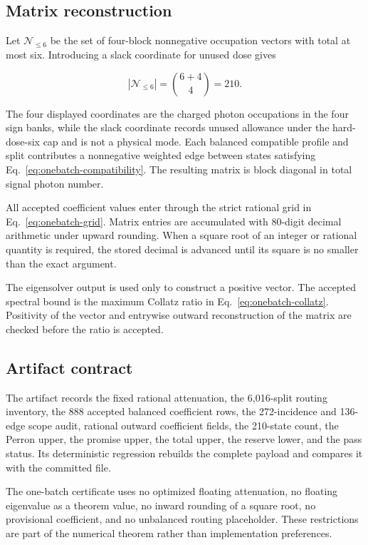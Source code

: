 \subsection{Matrix reconstruction}

Let $\mathcal N_{\le6}$ be the set of four-block nonnegative occupation vectors with total at most six. Introducing a slack coordinate for unused dose gives

\begin{equation}
|\mathcal N_{\le6}|=\binom{6+4}{4}=210.
\end{equation}

The four displayed coordinates are the charged photon occupations in the four sign banks, while the slack coordinate records unused allowance under the hard-dose-six cap and is not a physical mode. Each balanced compatible profile and split contributes a nonnegative weighted edge between states satisfying Eq.~\eqref{eq:onebatch-compatibility}. The resulting matrix is block diagonal in total signal photon number.

All accepted coefficient values enter through the strict rational grid in Eq.~\eqref{eq:onebatch-grid}. Matrix entries are accumulated with 80-digit decimal arithmetic under upward rounding. When a square root of an integer or rational quantity is required, the stored decimal is advanced until its square is no smaller than the exact argument.

The eigensolver output is used only to construct a positive vector. The accepted spectral bound is the maximum Collatz ratio in Eq.~\eqref{eq:onebatch-collatz}. Positivity of the vector and entrywise outward reconstruction of the matrix are checked before the ratio is accepted.

\subsection{Artifact contract}

The artifact  records the fixed rational attenuation, the 6,016-split routing inventory, the 888 accepted balanced coefficient rows, the 272-incidence and 136-edge scope audit, rational outward coefficient fields, the 210-state count, the Perron upper, the promise upper, the total upper, the reserve lower, and the pass status. Its deterministic regression rebuilds the complete payload and compares it with the committed file.

The one-batch certificate uses no optimized floating attenuation, no floating eigenvalue as a theorem value, no inward rounding of a square root, no provisional coefficient, and no unbalanced routing placeholder. These restrictions are part of the numerical theorem rather than implementation preferences.
